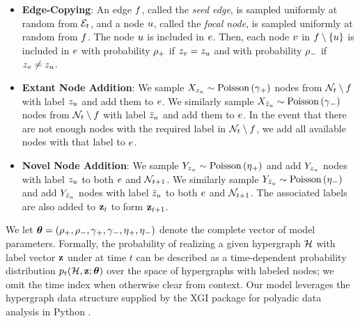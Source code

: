 \documentclass[aps,pre,reprint,superscriptaddress,nofootinbib]{revtex4-2}
\begin{document}
    \begin{itemize}
        \item 
            \textbf{Edge-Copying}: An edge $f$, called the \emph{seed edge}, is sampled uniformly at random from $\mathcal{E}_{t}$, and a node $u$, called the \emph{focal node}, is sampled uniformly at random from $f$. 
            The node $u$ is included in $e$.
            Then, each node $v$ in $f \setminus \{u\}$ is included in $e$ with probability $\rho{}_+$ if $z_{v} = z_{u}$ and with probability $\rho{}_-$ if $z_{v} \neq z_{u}$.
        \item 
            \textbf{Extant Node Addition}: We sample $X_{z_u} \sim \mathrm{Poisson}\left( \gamma{}_+ \right)$ nodes from $\mathcal{N}_{t} \setminus f$ with label $z_u$ and add them to $e$. 
            We similarly sample $X_{\bar{z}_u} \sim \mathrm{Poisson}\left( \gamma{}_- \right)$ nodes from $\mathcal{N}_{t} \setminus f$ with label $\bar{z}_u$ and add them to $e$.
            In the event that there are not enough nodes with the required label in $\mathcal{N}_{t} \setminus f$, we add all available nodes with that label to $e$.
        \item \textbf{Novel Node Addition}: We sample $Y_{z_u} \sim \mathrm{Poisson}\left( \eta{}_+ \right)$ and add $Y_{z_u}$ nodes with label $z_u$ to both $e$ and $\mathcal{N}_{t+1}$. 
        We similarly sample $Y_{\bar{z}_u} \sim \mathrm{Poisson}\left( \eta{}_- \right)$ and add $Y_{\bar{z}_u}$ nodes with label $\bar{z}_u$ to both $e$ and $\mathcal{N}_{t+1}$. 
        The associated labels are also added to $\mathbf{z}_{t}$ to form $\mathbf{z}_{t+1}$.
    \end{itemize}
    We let $\boldsymbol{\theta} = (\rho{}_+, \rho{}_-, \gamma{}_+, \gamma{}_-, \eta{}_+, \eta{}_-)$ denote the complete vector of model parameters. 
    Formally, the probability of realizing a given hypergraph $\mathcal{H}$ with label vector $\mathbf{z}$ under \model{} at time $t$ can be described as a time-dependent probability distribution $p_{t}(\mathcal{H}, \mathbf{z} ; \boldsymbol{\theta})$ over the space of hypergraphs with labeled nodes; we omit the time index when otherwise clear from context. 
    Our \model{} model leverages the hypergraph data structure supplied by the XGI package for polyadic data analysis in Python \cite{landryXGIPythonPackage2023}. 
\end{document}
